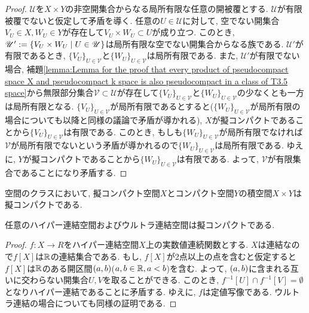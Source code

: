 \documentclass[uplatex, dvipdfmx, a4paper, 12pt, class=jsbook, crop=false]{standalone}
\begin{document}
\begin{proof}
	$ \mathscr{U} $を$ X \times Y $の非空開集合からなる局所有限な任意の開被覆とする. $ \mathscr{U} $が有限被覆でないと仮定して矛盾を導く. 任意の$ U \in \mathscr{U} $に対して, 空でない開集合$ V_U \in X, W_U \in Y $が存在して$ V_U \times W_U \subset U $が成り立つ. このとき, $ \mathscr{U}' \defeq \setcomp{V_U \times W_U}{U \in \mathscr{U}} $は局所有限な空でない開集合からなる族である. $ \mathscr{U}' $が有限であるとき, $ \{V_U\}_{U \in \mathscr{V}} $と$ \{W_U\}_{U \in \mathscr{V}} $は局所有限である. また, $ \mathscr{U}' $が有限でない場合, 補題\ref{lemma:Lemma for the proof that every product of pseudocompact space X and pseudocompact k space is also pseudocompact in a class of T3.5 space}から無限部分集合$ \mathscr{V} \subset \mathscr{U} $が存在して$ \{V_U\}_{U \in \mathscr{V}} $と$ \{W_U\}_{U \in \mathscr{V}} $の少なくとも一方は局所有限となる. $ \{V_U\}_{U \in \mathscr{V}} $が局所有限であるとすると($ \{W_U\}_{U \in \mathscr{V}} $が局所有限の場合についても以降と同様の議論で矛盾が導かれる), $ X $が擬コンパクトであることから$ \{V_U\}_{U \in \mathscr{V}} $は有限である. このとき, もしも$ \{W_U\}_{U \in \mathscr{V}} $が局所有限でなければ$ \mathscr{V} $が局所有限でないという矛盾が導かれるので$ \{W_U\}_{U \in \mathscr{V}} $は局所有限である. ゆえに, $ Y $が擬コンパクトであることから$ \{W_U\}_{U \in \mathscr{V}} $は有限である. よって, $ \mathscr{V} $が有限集合であることになり矛盾する.
\end{proof}

\begin{corollary}
	空間のクラスにおいて, 擬コンパクト空間$ X $とコンパクト空間$ Y $の積空間$ X \times Y $は擬コンパクトである.
\end{corollary}

\begin{proposition}
	任意のハイパー連結空間およびウルトラ連結空間は擬コンパクトである.
\end{proposition}

\begin{proof}
	$ f \colon X \to R $をハイパー連結空間$ X $上の実数値連続関数とする. $ X $は連結なので$ f[X] $は$ \mathbb{R} $の連結集合である. もし, $ f[X] $が2点以上の点を含むと仮定すると$ f[X] $は$ \mathbb{R} $のある開区間$ \left( a , b \right) $($ a, b \in \mathbb{R}, a < b$)を含む. よって, $ \left( a , b \right) $に含まれる互いに交わらない開集合$ U, V $を取ることができる. このとき, $ f^{-1}[U] \cap f^{-1}[V] = \emptyset $となりハイパー連結であることに矛盾する. ゆえに, $ f $は定値写像である. ウルトラ連結の場合についても同様の証明である.
\end{proof}
\end{document}

